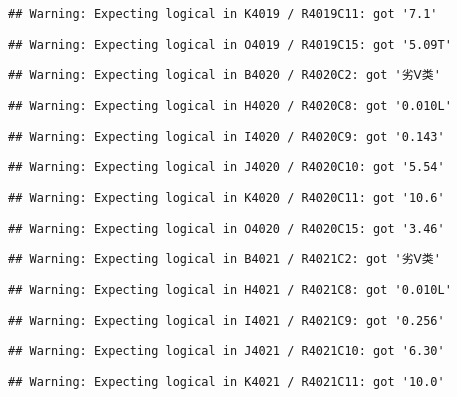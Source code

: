 \documentclass[
]{article}
\begin{document}
\begin{verbatim}
## Warning: Expecting logical in K4019 / R4019C11: got '7.1'
\end{verbatim}

\begin{verbatim}
## Warning: Expecting logical in O4019 / R4019C15: got '5.09T'
\end{verbatim}

\begin{verbatim}
## Warning: Expecting logical in B4020 / R4020C2: got '劣Ⅴ类'
\end{verbatim}

\begin{verbatim}
## Warning: Expecting logical in H4020 / R4020C8: got '0.010L'
\end{verbatim}

\begin{verbatim}
## Warning: Expecting logical in I4020 / R4020C9: got '0.143'
\end{verbatim}

\begin{verbatim}
## Warning: Expecting logical in J4020 / R4020C10: got '5.54'
\end{verbatim}

\begin{verbatim}
## Warning: Expecting logical in K4020 / R4020C11: got '10.6'
\end{verbatim}

\begin{verbatim}
## Warning: Expecting logical in O4020 / R4020C15: got '3.46'
\end{verbatim}

\begin{verbatim}
## Warning: Expecting logical in B4021 / R4021C2: got '劣Ⅴ类'
\end{verbatim}

\begin{verbatim}
## Warning: Expecting logical in H4021 / R4021C8: got '0.010L'
\end{verbatim}

\begin{verbatim}
## Warning: Expecting logical in I4021 / R4021C9: got '0.256'
\end{verbatim}

\begin{verbatim}
## Warning: Expecting logical in J4021 / R4021C10: got '6.30'
\end{verbatim}

\begin{verbatim}
## Warning: Expecting logical in K4021 / R4021C11: got '10.0'
\end{verbatim}
\end{document}
